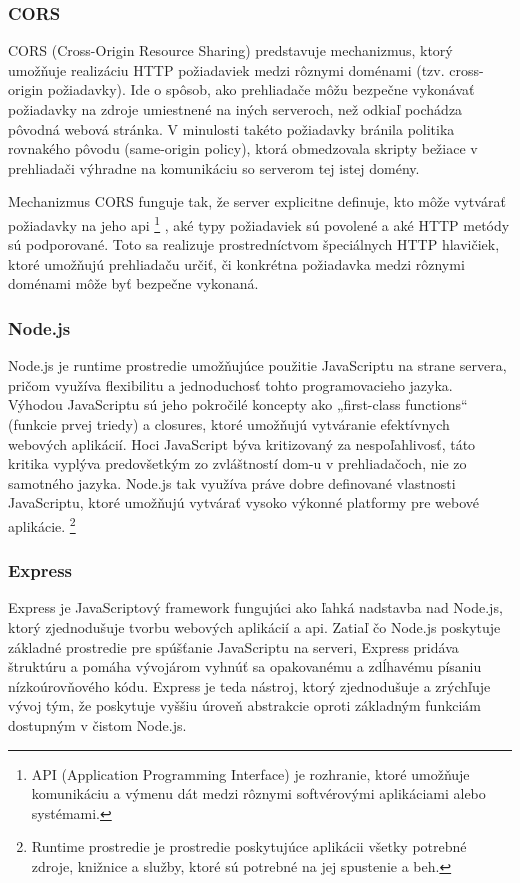 \subsubsection{CORS}
CORS (Cross-Origin Resource Sharing) predstavuje mechanizmus, ktorý umožňuje realizáciu HTTP požiadaviek medzi rôznymi doménami (tzv. cross-origin požiadavky).
 Ide o spôsob, ako prehliadače môžu bezpečne vykonávať požiadavky na zdroje umiestnené na iných serveroch, než odkiaľ pochádza pôvodná webová stránka. 
 V minulosti takéto požiadavky bránila politika rovnakého pôvodu (same-origin policy), ktorá obmedzovala skripty bežiace v prehliadači výhradne na komunikáciu so serverom tej istej domény.

Mechanizmus CORS funguje tak, že server explicitne definuje, kto môže vytvárať požiadavky na jeho \acrshort{api} \footnote{API (Application Programming Interface) je rozhranie, ktoré umožňuje komunikáciu a výmenu dát medzi rôznymi softvérovými aplikáciami alebo systémami.}
, aké typy požiadaviek sú povolené a aké HTTP metódy sú podporované.
 Toto sa realizuje prostredníctvom špeciálnych HTTP hlavičiek, ktoré umožňujú prehliadaču určiť, či konkrétna požiadavka medzi rôznymi doménami môže byť bezpečne vykonaná.
 \cite{CORS}
\subsubsection{Node.js}
Node.js je runtime prostredie umožňujúce použitie JavaScriptu na strane servera, pričom využíva flexibilitu a jednoduchosť tohto programovacieho jazyka.
 Výhodou JavaScriptu sú jeho pokročilé koncepty ako „first-class functions“ (funkcie prvej triedy) a closures, ktoré umožňujú vytváranie efektívnych webových aplikácií. 
 Hoci JavaScript býva kritizovaný za nespoľahlivosť, táto kritika vyplýva predovšetkým zo zvláštností \acrshort{dom}-u v prehliadačoch, nie zo samotného jazyka.
 Node.js tak využíva práve dobre definované vlastnosti JavaScriptu, ktoré umožňujú vytvárať vysoko výkonné platformy pre webové aplikácie. \cite{nodejs}
 \footnote{Runtime prostredie je prostredie poskytujúce aplikácii všetky potrebné zdroje, knižnice a služby, ktoré sú potrebné na jej spustenie a beh.}
\subsubsection{Express}
Express je JavaScriptový framework fungujúci ako ľahká nadstavba nad Node.js, ktorý zjednodušuje tvorbu webových aplikácií a \acrshort{api}. Zatiaľ čo Node.js poskytuje základné prostredie pre spúšťanie JavaScriptu na serveri, Express pridáva štruktúru a pomáha vývojárom vyhnúť sa opakovanému a zdĺhavému písaniu nízkoúrovňového kódu. Express je teda nástroj, ktorý zjednodušuje a zrýchľuje vývoj tým, že poskytuje vyššiu úroveň abstrakcie oproti základným funkciám dostupným v čistom Node.js.


